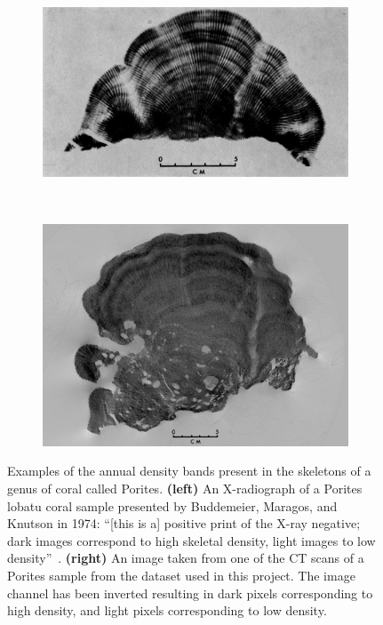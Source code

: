 \begin{figure}[t]
    \centering
    \begin{subfigure}[t]{0.49\textwidth}
        \centering
        \includegraphics[width=1\textwidth, valign=c]{images/knutson.jpg}
    \end{subfigure}
    ~
    \begin{subfigure}[t]{0.49\textwidth}
        \centering
        \includegraphics[width=1\textwidth, valign=c]{images/our-coral.png}
    \end{subfigure}
    \caption{Examples of the annual density bands present in the skeletons of a genus of coral called Porites. \textbf{(left)} An X-radiograph of a Porites lobatu coral sample presented by Buddemeier, Maragos, and Knutson in 1974: ``[this is a] positive print of the X-ray negative; dark images correspond to high skeletal density, light images to low density''~\cite{coralimage}. \textbf{(right)} An image taken from one of the CT scans of a Porites sample from the dataset used in this project. The image channel has been inverted resulting in dark pixels corresponding to high density, and light pixels corresponding to low density.}
    \label{fig:densityexample}
\end{figure}

